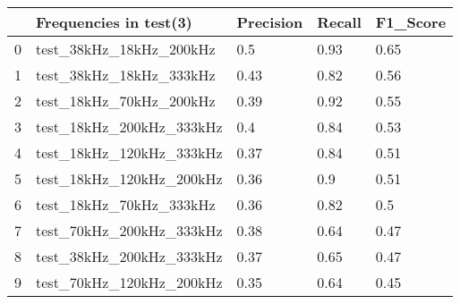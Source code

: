 \begin{longtable}{lllll}
\hline
\multicolumn{1}{|l|}{} & \multicolumn{1}{l|}{Frequencies in test(3)} & \multicolumn{1}{l|}{Precision} & \multicolumn{1}{l|}{Recall} & \multicolumn{1}{l|}{F1\_Score} \\ \hline
\endfirsthead
%
\endhead
%
\hline
\endfoot
%
\endlastfoot
%
0                      & test\_38kHz\_18kHz\_200kHz                  & 0.5                            & 0.93                        & 0.65                           \\
1                      & test\_38kHz\_18kHz\_333kHz                  & 0.43                           & 0.82                        & 0.56                           \\
2                      & test\_18kHz\_70kHz\_200kHz                  & 0.39                           & 0.92                        & 0.55                           \\
3                      & test\_18kHz\_200kHz\_333kHz                 & 0.4                            & 0.84                        & 0.53                           \\
4                      & test\_18kHz\_120kHz\_333kHz                 & 0.37                           & 0.84                        & 0.51                           \\
5                      & test\_18kHz\_120kHz\_200kHz                 & 0.36                           & 0.9                         & 0.51                           \\
6                      & test\_18kHz\_70kHz\_333kHz                  & 0.36                           & 0.82                        & 0.5                            \\
7                      & test\_70kHz\_200kHz\_333kHz                 & 0.38                           & 0.64                        & 0.47                           \\
8                      & test\_38kHz\_200kHz\_333kHz                 & 0.37                           & 0.65                        & 0.47                           \\
9                      & test\_70kHz\_120kHz\_200kHz                 & 0.35                           & 0.64                        & 0.45                           \\

\end{longtable}
